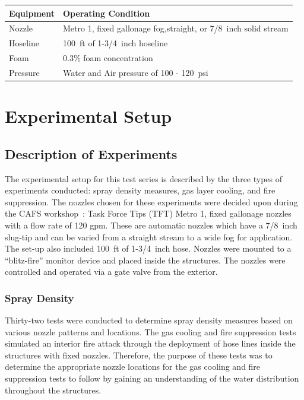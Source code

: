 \documentclass[12pt,oneside]{book}
\begin{document}
\begin{table}[!ht]
\centering
{}\label{tab:op_condition}
\begin{tabular}{ll}
\toprule[1.5pt]
Equipment    &   Operating Condition \\
\midrule
Nozzle       & Metro 1, fixed gallonage fog,straight, or 7/8~inch solid stream \\
Hoseline     & 100~ft of 1-3/4~inch hoseline \\
Foam         & 0.3\% foam concentration \\
Pressure     & Water and Air pressure of 100 - 120~psi \\
\bottomrule[1.25pt]
\end{tabular}\par
\end{table}


\chapter{Experimental Setup}

\section{Description of Experiments}
\label{sec:desc_experiments}
The experimental setup for this test series is described by the three types of experiments conducted: spray density measures, gas layer cooling, and fire suppression. The nozzles chosen for these experiments were decided upon during the CAFS workshop~\cite{Grant:2011}: Task Force Tips (TFT) Metro 1, fixed gallonage nozzles with a flow rate of 120 gpm. These are automatic nozzles which have a 7/8~inch slug-tip and can be varied from a straight stream to a wide fog for application. The set-up also included 100~ft of 1-3/4~inch hose. Nozzles were mounted to a ``blitz-fire'' monitor device and placed inside the structures. The nozzles were controlled and operated via a gate valve from the exterior. 

\subsection{Spray Density}
\label{sec:desc_Spray_Density}

Thirty-two tests were conducted to determine spray density measures based on various nozzle patterns and locations. The gas cooling and fire suppression tests simulated an interior fire attack through the deployment of hose lines inside the structures with fixed nozzles. Therefore, the purpose of these tests was to determine the appropriate nozzle locations for the gas cooling and fire suppression tests to follow by gaining an understanding of the water distribution throughout the structures. 
\end{document}
